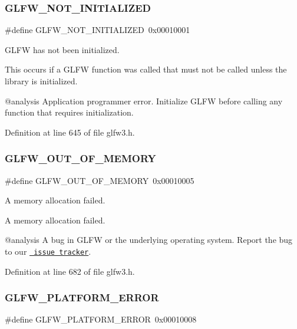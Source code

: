 \subsubsection{\texorpdfstring{GLFW\_NOT\_INITIALIZED}{GLFW\_NOT\_INITIALIZED}}
{\footnotesize\ttfamily \#define G\+L\+F\+W\+\_\+\+N\+O\+T\+\_\+\+I\+N\+I\+T\+I\+A\+L\+I\+Z\+ED~0x00010001}



G\+L\+FW has not been initialized. 

This occurs if a G\+L\+FW function was called that must not be called unless the library is initialized.

@analysis Application programmer error. Initialize G\+L\+FW before calling any function that requires initialization. 

Definition at line 645 of file glfw3.\+h.

\mbox{\label{group__errors_ga9023953a2bcb98c2906afd071d21ee7f}} 
\subsubsection{\texorpdfstring{GLFW\_OUT\_OF\_MEMORY}{GLFW\_OUT\_OF\_MEMORY}}
{\footnotesize\ttfamily \#define G\+L\+F\+W\+\_\+\+O\+U\+T\+\_\+\+O\+F\+\_\+\+M\+E\+M\+O\+RY~0x00010005}



A memory allocation failed. 

A memory allocation failed.

@analysis A bug in G\+L\+FW or the underlying operating system. Report the bug to our \href{https://github.com/glfw/glfw/issues}{\texttt{ issue tracker}}. 

Definition at line 682 of file glfw3.\+h.

\mbox{\label{group__errors_gad44162d78100ea5e87cdd38426b8c7a1}} 
\subsubsection{\texorpdfstring{GLFW\_PLATFORM\_ERROR}{GLFW\_PLATFORM\_ERROR}}
{\footnotesize\ttfamily \#define G\+L\+F\+W\+\_\+\+P\+L\+A\+T\+F\+O\+R\+M\+\_\+\+E\+R\+R\+OR~0x00010008}



